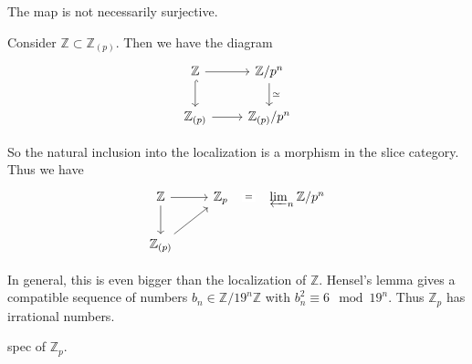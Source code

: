 \begin{remark}
    The map is not necessarily surjective. 


    Consider $\mathbb{Z}\subset \mathbb{Z}_{(p)}$. Then we have the diagram%
\[\begin{tikzcd}
	{\mathbb{Z}} & {\mathbb{Z}/p^n} \\
	{\mathbb{Z}_{(p)}} & {\mathbb{Z}_{(p)}/p^n}
	\arrow[from=1-1, to=1-2]
	\arrow[hook, from=1-1, to=2-1]
	\arrow["\simeq", from=1-2, to=2-2]
	\arrow[from=2-1, to=2-2]
\end{tikzcd}\]

So the natural inclusion into the localization is a morphism in the slice category. Thus we have %
\[\begin{tikzcd}
	{\mathbb{Z}} & {\mathbb{Z}_p} & {\varprojlim_n \mathbb{Z}/p^n} \\
	{\mathbb{Z}_{(p)}}
	\arrow[from=1-1, to=1-2]
	\arrow[from=1-1, to=2-1]
	\arrow["{=}"{description}, draw=none, from=1-2, to=1-3]
	\arrow[from=2-1, to=1-2]
\end{tikzcd}\]


In general, this is even bigger than the localization of $\mathbb{Z}$.
Hensel's lemma gives a compatible sequence of numbers $b_n\in \mathbb{Z}/19^n\mathbb{Z}$ with $b_n^2\equiv 6\mod 19^n$. Thus $\mathbb{Z}_p$ has irrational numbers.
\end{remark}





\todo spec of $\mathbb{Z}_p$.
